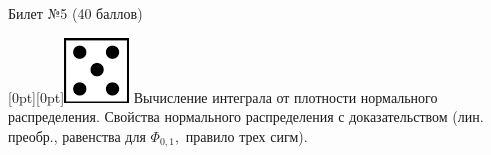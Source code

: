 \documentclass[10pt]{article}
\begin{document}
\thispagestyle{empty}

\topskip=0pt

\vspace*{\fill}

\begin{center} {\Large Билет №5 (40 баллов)} \end{center}

\raisebox{-1pt}[0pt][0pt]{\includegraphics[width=0.02\linewidth]{5.png}} Вычисление интеграла от плотности нормального распределения.  Свойства нормального распределения с доказательством (лин. преобр., равенства для $\Phi_{0,1},$ правило трех сигм). \\









\vspace*{\fill}
\end{document}
